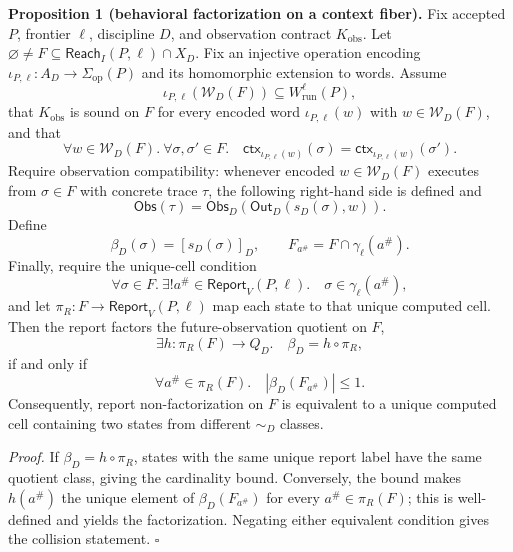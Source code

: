 \documentclass[conference]{IEEEtran}
\begin{document}
\medskip
\noindent\textbf{Proposition 1 (behavioral factorization on a context fiber).}
Fix accepted $P$, frontier $\ell$, discipline $D$, and observation contract $K_{\mathrm{obs}}$. Let $\varnothing\ne F\subseteq\mathsf{Reach}_I(P,\ell)\cap X_D$. Fix an injective operation encoding $\iota_{P,\ell}:A_D\to\Sigma_{\mathrm{op}}(P)$ and its homomorphic extension to words. Assume
\begin{equation}
\iota_{P,\ell}(\mathcal W_D(F))
\subseteq W^\ell_{\mathrm{run}}(P),
\end{equation}
that $K_{\mathrm{obs}}$ is sound on $F$ for every encoded word
$\iota_{P,\ell}(w)$ with $w\in\mathcal W_D(F)$, and that
\begin{equation}
\forall w\in\mathcal W_D(F).\ \forall\sigma,\sigma'\in F.\quad
\mathsf{ctx}_{\iota_{P,\ell}(w)}(\sigma)
=
\mathsf{ctx}_{\iota_{P,\ell}(w)}(\sigma').
\end{equation}
Require observation compatibility: whenever encoded $w\in\mathcal W_D(F)$ executes from $\sigma\in F$ with concrete trace $\tau$, the following right-hand side is defined and
\begin{equation}
\mathsf{Obs}(\tau)
=\mathsf{Obs}_D(\mathsf{Out}_D(s_D(\sigma),w)).
\end{equation}
Define
\begin{equation}
\beta_D(\sigma)=[s_D(\sigma)]_D,
\qquad
F_{a^\#}=F\cap\gamma_\ell(a^\#).
\end{equation}
Finally, require the unique-cell condition
\begin{equation}
\forall\sigma\in F.\ \exists!a^\#\in\mathsf{Report}_V(P,\ell).\quad
\sigma\in\gamma_\ell(a^\#),
\end{equation}
and let $\pi_R:F\to\mathsf{Report}_V(P,\ell)$ map each state to that unique computed cell. Then the report factors the future-observation quotient on $F$,
\begin{equation}
\exists h:\pi_R(F)\to Q_D.\quad
\beta_D=h\circ\pi_R,
\end{equation}
if and only if
\begin{equation}
\forall a^\#\in\pi_R(F).\quad |\beta_D(F_{a^\#})|\le1.
\end{equation}
Consequently, report non-factorization on $F$ is equivalent to a unique computed cell containing two states from different $\sim_D$ classes.

\emph{Proof.} If $\beta_D=h\circ\pi_R$, states with the same unique report label have the same quotient class, giving the cardinality bound. Conversely, the bound makes $h(a^\#)$ the unique element of $\beta_D(F_{a^\#})$ for every $a^\#\in\pi_R(F)$; this is well-defined and yields the factorization. Negating either equivalent condition gives the collision statement. \hfill$\square$
\end{document}
